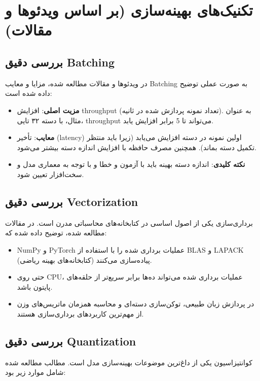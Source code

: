 \documentclass[12pt,a4paper]{report}
\newcommand{\eng}[1]{\textenglish{#1}}
\begin{document}
	\chapter{تکنیک‌های بهینه‌سازی (بر اساس ویدئوها و مقالات)}
	
	\section{بررسی دقیق Batching}
	در ویدئوها و مقالات مطالعه شده، مزایا و معایب \eng{Batching} به صورت عملی توضیح داده شده است:
	
	\begin{itemize}
		\item \textbf{مزیت اصلی}: افزایش \eng{throughput} (تعداد نمونه پردازش شده در ثانیه). به عنوان مثال، با دسته ۳۲ تایی، \eng{throughput} می‌تواند تا \eng{5} برابر افزایش یابد.
		\item \textbf{معایب}: تأخیر (\eng{latency}) اولین نمونه در دسته افزایش می‌یابد (زیرا باید منتظر تکمیل دسته بماند). همچنین مصرف حافظه با افزایش اندازه دسته بیشتر می‌شود.
		\item \textbf{نکته کلیدی}: اندازه دسته بهینه باید با آزمون و خطا و با توجه به معماری مدل و سخت‌افزار تعیین شود.
	\end{itemize}
	
	\section{بررسی دقیق Vectorization}
	برداری‌سازی یکی از اصول اساسی در کتابخانه‌های محاسباتی مدرن است. در مقالات مطالعه شده، توضیح داده شده که:
	
	\begin{itemize}
		\item \eng{NumPy} و \eng{PyTorch} عملیات برداری شده را با استفاده از \eng{BLAS} و \eng{LAPACK} (کتابخانه‌های بهینه ریاضی) پیاده‌سازی می‌کنند.
		\item حتی روی \eng{CPU}، عملیات برداری شده می‌تواند ده‌ها برابر سریع‌تر از حلقه‌های پایتون باشد.
		\item در پردازش زبان طبیعی، توکن‌سازی دسته‌ای و محاسبه همزمان ماتریس‌های وزن از مهم‌ترین کاربردهای برداری‌سازی هستند.
	\end{itemize}
	
	\section{بررسی دقیق Quantization}
	کوانتیزاسیون یکی از داغ‌ترین موضوعات بهینه‌سازی مدل است. مطالب مطالعه شده شامل موارد زیر بود:
	
\end{document}
